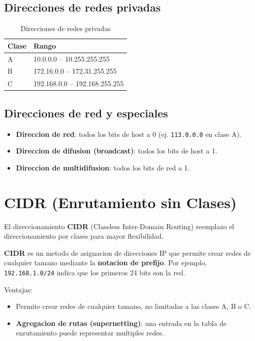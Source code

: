 \subsection{Direcciones de redes privadas}

\begin{table}[htbp]
\centering
\small
\caption{Direcciones de redes privadas}
\begin{tabularx}{\textwidth}{@{}lX@{}}
\toprule
\textbf{Clase} & \textbf{Rango} \\
\midrule
A & 10.0.0.0 -- 10.255.255.255 \\
B & 172.16.0.0 -- 172.31.255.255 \\
C & 192.168.0.0 -- 192.168.255.255 \\
\bottomrule
\end{tabularx}
\end{table}

\subsection{Direcciones de red y especiales}

\begin{itemize}
    \item \textbf{Direccion de red}: todos los bits de host a 0 (ej. \texttt{113.0.0.0} en clase A).
    \item \textbf{Direccion de difusion (broadcast)}: todos los bits de host a 1.
    \item \textbf{Direccion de multidifusion}: todos los bits de red a 1.
\end{itemize}


\section{CIDR (Enrutamiento sin Clases)}

El direccionamiento \textbf{CIDR} (Classless Inter-Domain Routing) reemplazo el direccionamiento por clases para mayor flexibilidad.

\begin{definicion}
\textbf{CIDR} es un metodo de asignacion de direcciones IP que permite crear redes de cualquier tamano mediante la \textbf{notacion de prefijo}. Por ejemplo, \texttt{192.168.1.0/24} indica que los primeros 24 bits son la red.
\end{definicion}

Ventajas:
\begin{itemize}
    \item Permite crear redes de cualquier tamano, no limitadas a las clases A, B o C.
    \item \textbf{Agregacion de rutas (supernetting)}: una entrada en la tabla de enrutamiento puede representar multiples redes.
\end{itemize}

